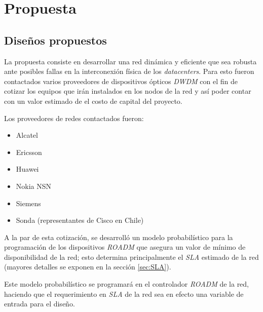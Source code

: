 \section{Propuesta}
\label{sec:propuesta}



\subsection{Diseños propuestos}
\label{sec:disenos}

La propuesta consiste en desarrollar una red dinámica y eficiente que
sea robusta ante posibles fallas en la interconexión física de los
\emph{datacenters}. Para esto fueron contactados varios proveedores de
dispositivos ópticos \emph{DWDM} con el fin de cotizar los equipos que 
irán instalados en los nodos de la red y así poder contar con un valor 
estimado de el costo de capital del proyecto.

Los proveedores de redes contactados fueron:
\begin{itemize}
\item Alcatel
\item Ericsson
\item Huawei
\item Nokia NSN
\item Siemens
\item Sonda (representantes de Cisco en Chile)
\end{itemize}

A la par de esta cotización, se desarrolló un modelo probabilístico 
para la programación de los dispositivos \emph{ROADM}
que asegura un valor de mínimo de disponibilidad de la red; esto
determina principalmente el \emph{SLA} estimado de la red (mayores
detalles se exponen en la sección \ref{sec:SLA}).

Este modelo probabilístico se programará en el controlador
\emph{ROADM} de la red, haciendo que el requerimiento en \emph{SLA} de
la red sea en efecto una variable de entrada para el diseño.




